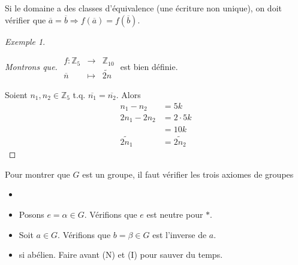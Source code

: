 \documentclass{report}
\newcommand*{\entiers}{\mathbb{Z}}
\theoremstyle{definition}
\theoremstyle{remark}
\newtheorem*{exem}{Exemple}
\begin{document}
	Si le domaine a des classes d'\'equivalence (une \'ecriture non unique), on doit v\'erifier que $\overline{a}=\overline{b} \Rightarrow f(\overline{a})=f(\overline{b})$.
	\begin{exem}~

		\begin{proof}[Montrons que]
			$\begin{array}{rcl}
				f:\entiers_5&\to&\entiers_{10}\\
				\overline{n}&\mapsto&\widetilde{2n}
			\end{array}$ est bien d\'efinie.

			Soient $n_1, n_2 \in \entiers_5$ t.q. $\overline{n_1} = \overline{n_2}$. Alors
			\begin{align*}
				n_1-n_2&= 5k\\
				2n_1-2n_2&= 2 \cdot 5k\\
				&= 10k\\
				\widetilde{2n_1}&= \widetilde{2n_2}
			\end{align*}
		\end{proof}
	\end{exem}

	Pour montrer que $G$ est un groupe, il faut v\'erifier les trois axiomes de groupes
	\begin{itemize}
		\item[(A)]
		\item[(N)] Posons $e= \alpha \in G$. V\'erifions que $e$ est neutre pour $*$.
		\item[(I)] Soit $a \in G$. V\'erifions que $b=\beta \in G$ est l'inverse de $a$.
		\item[(C)] si ab\'elien. Faire avant (N) et (I) pour sauver du temps.
	\end{itemize}
\end{document}
